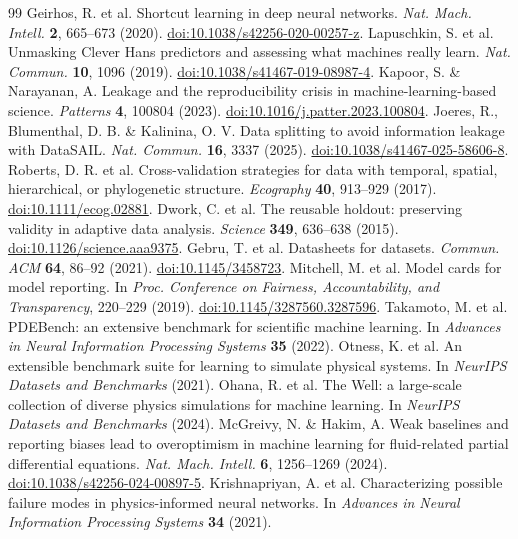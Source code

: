 \documentclass[10pt,a4paper,twocolumn]{article}
\newcommand{\doilink}[1]{\href{https://doi.org/#1}{doi:#1}}
\begin{document}
\begingroup
\raggedright
\fontsize{8.4}{9.8}\selectfont
\setlength{\bibsep}{1pt}
\begin{thebibliography}{99}
 Geirhos, R. et al. Shortcut learning in deep neural networks. \emph{Nat. Mach. Intell.} \textbf{2}, 665--673 (2020). \doilink{10.1038/s42256-020-00257-z}.
 Lapuschkin, S. et al. Unmasking Clever Hans predictors and assessing what machines really learn. \emph{Nat. Commun.} \textbf{10}, 1096 (2019). \doilink{10.1038/s41467-019-08987-4}.
 Kapoor, S. \& Narayanan, A. Leakage and the reproducibility crisis in machine-learning-based science. \emph{Patterns} \textbf{4}, 100804 (2023). \doilink{10.1016/j.patter.2023.100804}.
 Joeres, R., Blumenthal, D. B. \& Kalinina, O. V. Data splitting to avoid information leakage with DataSAIL. \emph{Nat. Commun.} \textbf{16}, 3337 (2025). \doilink{10.1038/s41467-025-58606-8}.
 Roberts, D. R. et al. Cross-validation strategies for data with temporal, spatial, hierarchical, or phylogenetic structure. \emph{Ecography} \textbf{40}, 913--929 (2017). \doilink{10.1111/ecog.02881}.
 Dwork, C. et al. The reusable holdout: preserving validity in adaptive data analysis. \emph{Science} \textbf{349}, 636--638 (2015). \doilink{10.1126/science.aaa9375}.
 Gebru, T. et al. Datasheets for datasets. \emph{Commun. ACM} \textbf{64}, 86--92 (2021). \doilink{10.1145/3458723}.
 Mitchell, M. et al. Model cards for model reporting. In \emph{Proc. Conference on Fairness, Accountability, and Transparency}, 220--229 (2019). \doilink{10.1145/3287560.3287596}.
 Takamoto, M. et al. PDEBench: an extensive benchmark for scientific machine learning. In \emph{Advances in Neural Information Processing Systems} \textbf{35} (2022).
 Otness, K. et al. An extensible benchmark suite for learning to simulate physical systems. In \emph{NeurIPS Datasets and Benchmarks} (2021).
 Ohana, R. et al. The Well: a large-scale collection of diverse physics simulations for machine learning. In \emph{NeurIPS Datasets and Benchmarks} (2024).
 McGreivy, N. \& Hakim, A. Weak baselines and reporting biases lead to overoptimism in machine learning for fluid-related partial differential equations. \emph{Nat. Mach. Intell.} \textbf{6}, 1256--1269 (2024). \doilink{10.1038/s42256-024-00897-5}.
 Krishnapriyan, A. et al. Characterizing possible failure modes in physics-informed neural networks. In \emph{Advances in Neural Information Processing Systems} \textbf{34} (2021).

\end{thebibliography}
\end{document}
